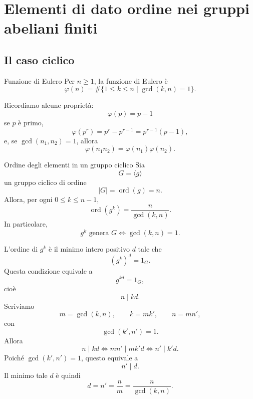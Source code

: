 \documentclass[a4paper]{article}
\begin{document}
\pagebreak

\section{Elementi di dato ordine nei gruppi abeliani finiti}

\subsection{Il caso ciclico}

\begin{radioactive}
\begin{snippetdefinition}{Funzione di Eulero}
    Per \(n\geq 1\), la funzione di Eulero è
    \[
        \varphi(n)
        =
        \#\{1\leq k\leq n\mid \gcd(k,n)=1\}.
    \]
\end{snippetdefinition}
\end{radioactive}

\begin{radioactive}
Ricordiamo alcune proprietà:
\[
    \varphi(p)=p-1
\]
se \(p\) è primo,
\[
    \varphi(p^r)=p^r-p^{r-1}=p^{r-1}(p-1),
\]
e, se \(\gcd(n_1,n_2)=1\), allora
\[
    \varphi(n_1n_2)=\varphi(n_1)\varphi(n_2).
\]
\end{radioactive}

\begin{radioactive}
\begin{snippetproposition}{Ordine degli elementi in un gruppo ciclico}
    Sia
    \[
        G=\langle g\rangle
    \]
    un gruppo ciclico di ordine
    \[
        |G|=\operatorname{ord}(g)=n.
    \]
    Allora, per ogni \(0\leq k\leq n-1\),
    \[
        \operatorname{ord}(g^k)
        =
        \frac{n}{\gcd(k,n)}.
    \]
    In particolare,
    \[
        g^k \text{ genera } G
        \iff
        \gcd(k,n)=1.
    \]
\end{snippetproposition}
\end{radioactive}

\begin{radioactive}
\begin{snippetproof}{}
    L'ordine di \(g^k\) è il minimo intero positivo \(d\) tale che
    \[
        (g^k)^d=1_G.
    \]
    Questa condizione equivale a
    \[
        g^{kd}=1_G,
    \]
    cioè
    \[
        n\mid kd.
    \]
    Scriviamo
    \[
        m=\gcd(k,n),
        \qquad
        k=mk',
        \qquad
        n=mn',
    \]
    con
    \[
        \gcd(k',n')=1.
    \]
    Allora
    \[
        n\mid kd
        \iff
        mn'\mid mk'd
        \iff
        n'\mid k'd.
    \]
    Poiché \(\gcd(k',n')=1\), questo equivale a
    \[
        n'\mid d.
    \]
    Il minimo tale \(d\) è quindi
    \[
        d=n'=\frac{n}{m}=\frac{n}{\gcd(k,n)}.
    \]
\end{snippetproof}
\end{radioactive}
\end{document}

